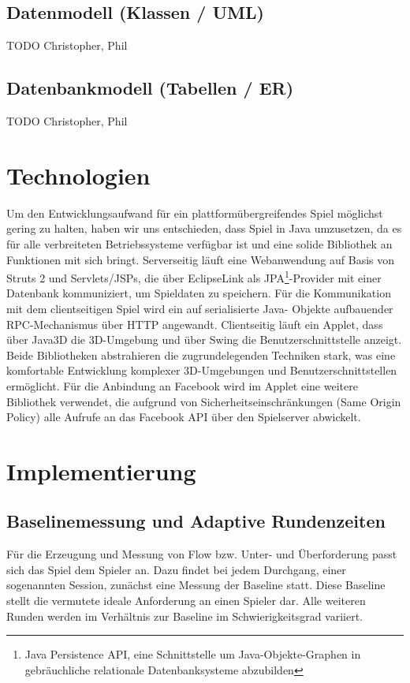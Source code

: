 \documentclass[a4paper,12pt]{scrartcl}
\begin{document}
\subsection{Datenmodell (Klassen / UML)}
TODO Christopher, Phil

\subsection{Datenbankmodell (Tabellen / ER)}
TODO Christopher, Phil

\section{Technologien}
Um den Entwicklungsaufwand für ein plattformübergreifendes Spiel möglichst gering
zu halten, haben wir uns entschieden, dass Spiel in Java umzusetzen, da es für alle
verbreiteten Betriebssysteme verfügbar ist und eine solide Bibliothek an Funktionen mit sich
bringt.
Serverseitig läuft eine Webanwendung auf Basis von Struts 2 und Servlets/JSPs, die
über EclipseLink als JPA\footnote{Java Persistence API, eine Schnittstelle um
Java-Objekte-Graphen in gebräuchliche relationale Datenbanksysteme abzubilden}-Provider mit einer Datenbank kommuniziert, um
Spieldaten zu speichern. Für die Kommunikation mit dem clientseitigen Spiel wird ein auf serialisierte Java-
Objekte aufbauender RPC-Mechanismus über HTTP angewandt.
Clientseitig läuft ein Applet, dass über Java3D die 3D-Umgebung und über Swing die
Benutzerschnittstelle anzeigt. Beide Bibliotheken abstrahieren die zugrundelegenden
Techniken stark, was eine komfortable Entwicklung komplexer 3D-Umgebungen und
Benutzerschnittstellen ermöglicht. Für die Anbindung an Facebook wird im Applet eine
weitere Bibliothek verwendet, die aufgrund von Sicherheitseinschränkungen (Same Origin
Policy) alle Aufrufe an das Facebook API über den Spielserver abwickelt.

\section{Implementierung}
\subsection{Baselinemessung und Adaptive Rundenzeiten}
Für die Erzeugung und Messung von Flow bzw. Unter- und Überforderung passt sich das
Spiel dem Spieler an. Dazu findet bei jedem Durchgang, einer sogenannten Session,
zunächst eine Messung der Baseline statt. Diese Baseline stellt die vermutete ideale
Anforderung an einen Spieler dar. Alle weiteren Runden werden im Verhältnis zur Baseline
im Schwierigkeitsgrad variiert.
\end{document}
